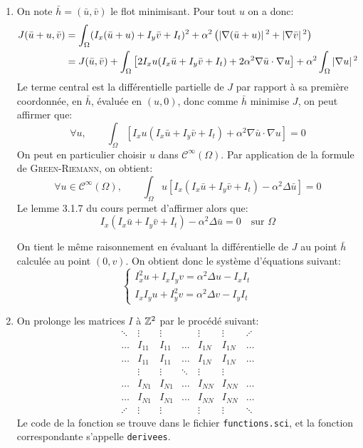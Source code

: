 \begin{enumerate}[questions]
\item On note $\bar{h} = (\bar{u}, \bar{v})$ le flot minimisant. Pour tout $u$ on a donc:
\begin{align*}
J(\bar{u}+u, \bar{v}) &= \int_{\Omega} (I_x(\bar{u}+u) + I_y\bar{v} + I_t)^2 + \alpha^2\left( \abs{\nabla (\bar{u}+u)}^2 + \abs{\nabla \bar{v}}^2 \right) \\
&= J(\bar{u}, \bar{v}) + \int_\Omega \left[2 I_x u(I_x\bar{u} + I_y\bar{v} + I_t) + 2\alpha^2 \nabla\bar{u} \cdot \nabla u\right] + \alpha^2 \int_\Omega \abs{\nabla u}^2
\end{align*}
Le terme central est la différentielle partielle de $J$ par rapport à sa première coordonnée, en $\bar{h}$, évaluée en $(u, 0)$, donc comme $\bar{h}$ minimise $J$, on peut affirmer que:
\[ \forall u, \qquad \int_\Omega \left[I_x u(I_x\bar{u} + I_y\bar{v} + I_t) + \alpha^2 \nabla\bar{u} \cdot \nabla u\right] = 0 \]
On peut en particulier choisir $u$ dans $\mathscr{C}^\infty(\Omega)$. Par application de la formule de \textsc{Green-Riemann}, on obtient:
\[ \forall u \in \mathscr{C}^\infty(\Omega), \qquad \int_\Omega u\left[I_x(I_x\bar{u} + I_y\bar{v} + I_t) - \alpha^2 \Delta\bar{u} \right] = 0 \]
Le lemme 3.1.7 du cours permet d'affirmer alors que:
\[ I_x(I_x\bar{u} + I_y\bar{v} + I_t) - \alpha^2 \Delta\bar{u} = 0 \quad \text{sur } \Omega \]

On tient le même raisonnement en évaluant la différentielle de $J$ au point $\bar{h}$ calculée au point $(0, v)$. On obtient donc le système d'équations suivant:
\begin{equation}
\begin{cases*}
I_x^2 u + I_xI_y v = \alpha^2 \Delta u - I_xI_t \\
I_xI_y u + I_y^2 v = \alpha^2 \Delta v - I_yI_t 
\end{cases*} \label{eq:syst}
\end{equation}

\item On \og{}prolonge\fg{} les matrices $I$ à $\mathbb{Z}^2$ par le procédé suivant:
	\[ \begin{array}{cc|ccc|cc}
	\ddots & \vdots & \vdots & & \vdots & \vdots & \iddots \\
	\dots & I_{11} & I_{11} & \dots & I_{1N} & I_{1N} & \dots \\ \hline
	\dots & I_{11} & I_{11} & \dots & I_{1N} & I_{1N} & \dots \\
	 & \vdots & \vdots & \ddots & \vdots & \vdots &  \\
	\dots & I_{N1} & I_{N1} & \dots & I_{NN} & I_{NN} & \dots \\ \hline
	\dots & I_{N1} & I_{N1} & \dots & I_{NN} & I_{NN} & \dots \\
	\iddots & \vdots & \vdots & & \vdots & \vdots & \ddots
	\end{array} \]
Le code de la fonction se trouve dans le fichier \verb|functions.sci|, et la fonction correspondante s'appelle \verb|derivees|.


\end{enumerate}
